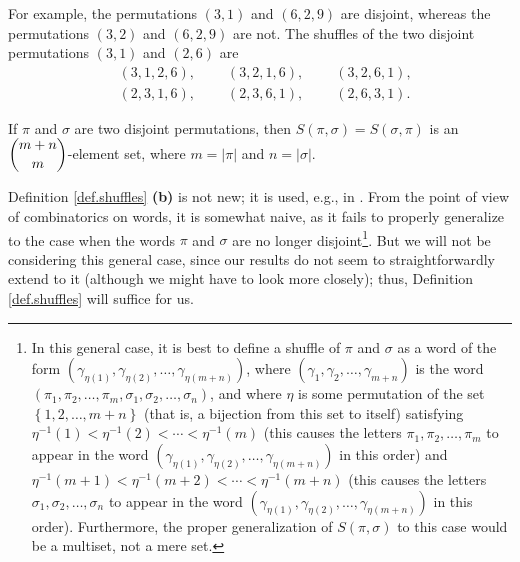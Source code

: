 \documentclass[numbers=enddot,12pt,final,onecolumn,notitlepage]{scrartcl}%
\theoremstyle{definition}
\begin{document}
For example, the permutations $\left(  3,1\right)  $ and $\left(
6,2,9\right)  $ are disjoint, whereas the permutations $\left(  3,2\right)  $
and $\left(  6,2,9\right)  $ are not. The shuffles of the two disjoint
permutations $\left(  3,1\right)  $ and $\left(  2,6\right)  $ are%
\begin{align*}
&  \left(  3,1,2,6\right)  ,\ \ \ \ \ \ \ \ \ \ \left(  3,2,1,6\right)
,\ \ \ \ \ \ \ \ \ \ \left(  3,2,6,1\right)  ,\\
&  \left(  2,3,1,6\right)  ,\ \ \ \ \ \ \ \ \ \ \left(  2,3,6,1\right)
,\ \ \ \ \ \ \ \ \ \ \left(  2,6,3,1\right)  .
\end{align*}


If $\pi$ and $\sigma$ are two disjoint permutations, then $S\left(  \pi
,\sigma\right)  =S\left(  \sigma,\pi\right)  $ is an $\dbinom{m+n}{m}$-element
set, where $m=\left\vert \pi\right\vert $ and $n=\left\vert \sigma\right\vert
$.

Definition \ref{def.shuffles} \textbf{(b)} is not new; it is used, e.g., in
\cite{Greene88}. From the point of view of combinatorics on words, it is
somewhat naive, as it fails to properly generalize to the case when the words
$\pi$ and $\sigma$ are no longer disjoint\footnote{In this general case, it is
best to define a shuffle of $\pi$ and $\sigma$ as a word of the form $\left(
\gamma_{\eta\left(  1\right)  },\gamma_{\eta\left(  2\right)  },\ldots
,\gamma_{\eta\left(  m+n\right)  }\right)  $, where $\left(  \gamma_{1}%
,\gamma_{2},\ldots,\gamma_{m+n}\right)  $ is the word $\left(  \pi_{1},\pi
_{2},\ldots,\pi_{m},\sigma_{1},\sigma_{2},\ldots,\sigma_{n}\right)  $, and
where $\eta$ is some permutation of the set $\left\{  1,2,\ldots,m+n\right\}
$ (that is, a bijection from this set to itself) satisfying $\eta^{-1}\left(
1\right)  <\eta^{-1}\left(  2\right)  <\cdots<\eta^{-1}\left(  m\right)  $
(this causes the letters $\pi_{1},\pi_{2},\ldots,\pi_{m}$ to appear in the
word $\left(  \gamma_{\eta\left(  1\right)  },\gamma_{\eta\left(  2\right)
},\ldots,\gamma_{\eta\left(  m+n\right)  }\right)  $ in this order) and
$\eta^{-1}\left(  m+1\right)  <\eta^{-1}\left(  m+2\right)  <\cdots<\eta
^{-1}\left(  m+n\right)  $ (this causes the letters $\sigma_{1},\sigma
_{2},\ldots,\sigma_{n}$ to appear in the word $\left(  \gamma_{\eta\left(
1\right)  },\gamma_{\eta\left(  2\right)  },\ldots,\gamma_{\eta\left(
m+n\right)  }\right)  $ in this order). Furthermore, the proper generalization
of $S\left(  \pi,\sigma\right)  $ to this case would be a multiset, not a mere
set.}. But we will not be considering this general case, since our results do
not seem to straightforwardly extend to it (although we might have to look
more closely); thus, Definition \ref{def.shuffles} will suffice for us.
\end{document}
